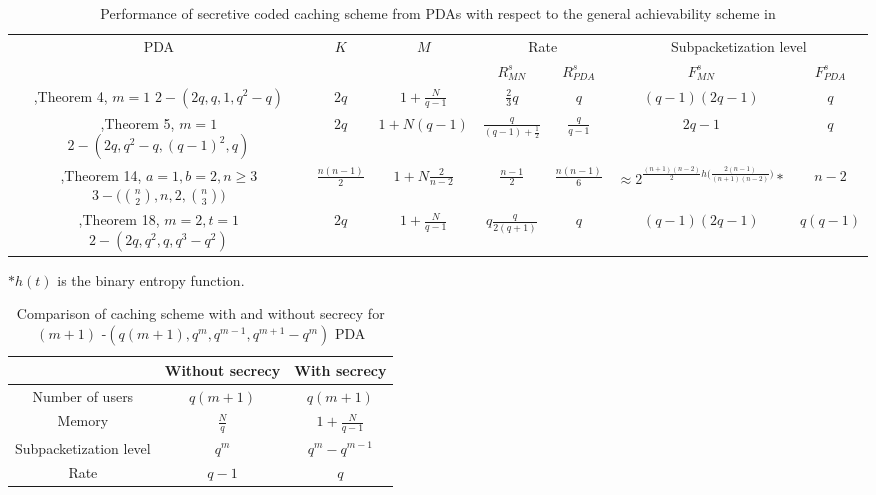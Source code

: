 \documentclass[conference]{IEEEtran}
\begin{document}
\begin{table*}[tp]
	\caption{Performance of secretive coded caching scheme from PDAs with respect to the general achievability scheme in \cite{PrivateCc}}
	\begin{center}
	\begin{tabular}{|c|c|c|c|c|c|c|}
		\hline
		\multirow{2}{*}{PDA} & \multirow{2}{*}{$K$} & \multirow{2}{*}{$M$} & \multicolumn{2}{c|}{Rate} & \multicolumn{2}{c|}{Subpacketization level}\\
		\cline{4-7}
		& & & $R^s_{MN}$\cite{PrivateCc} & $R^s_{PDA}$ & $F^s_{MN}$\cite{PrivateCc} & $F^s_{PDA}$\\
		\hline
		\hline
		\thead{\cite{PDAmain},Theorem 4,\\$m=1$\\$2-(2q,q,1,q^2-q)$} & $2q$ & $1+\frac{N}{q-1}$ & $\frac{2}{3}q$ & $q$ &  $(q-1)(2q-1)$ & $q$ \\
		\hline
		\thead{\cite{PDAmain},Theorem 5,\\$m=1$\\$2-(2q,q^2-q,(q-1)^2,q)$} & $2q$ & $1+N(q-1)$ & $\frac{q}{(q-1)+\frac{1}{2}}$  & $\frac{q}{q-1}$  & $2q-1$ & $q$ \\
		\hline
		\thead{\cite{PDAhyperg},Theorem 14,\\ $a=1,b=2,n\geq 3$\\$3-\bigg(\binom{n}{2},n,2,\binom{n}{3}\bigg)$} & $\frac{n(n-1)}{2}$ & $1+N\frac{2}{n-2}$  &$\frac{n-1}{2}$ & $\frac{n(n-1)}{6}$ & $\approx 2^{\frac{(n+1)(n-2)}{2} h\big(\frac{2(n-1)}{(n+1)(n-2)}\big)}*$  & $n-2$\\
		\hline
		\thead{\cite{PDAhyperg},Theorem 18,\\$m=2,t=1$\\$2-(2q,q^2,q,q^3-q^2)$} & $2q$ & $1+\frac{N}{q-1}$  & $q\frac{q}{2(q+1)}$ & $q$ &  $(q-1)(2q-1)$ & $q(q-1)$\\
		\hline
	\end{tabular}
	\end{center}
	\label{comp}
	 $*h(t)$ is the binary entropy function.
\end{table*}
\begin{table}[htbp]
    \centering
        \caption{Comparison of caching scheme with and without secrecy for $(m+1)$ -$(q(m+1),q^m,q^{m-1},q^{m+1}-q^m)$ PDA \cite{PDAmain}}
    \begin{tabular}{|c|c|c|}
    \hline
      & Without secrecy\cite{PDAmain}  &  With secrecy\\
      \hline
    Number of users & $q(m+1)$ & $q(m+1)$\\
    \hline
    Memory & $\frac{N}{q}$ & $1+\frac{N}{q-1}$\\
    \hline
    Subpacketization level & $q^m$ & $q^m-q^{m-1}$\\
    \hline
    Rate & $q-1$ & $q$\\
    \hline
    \end{tabular}
\label{tab2}
\end{table}
\end{document}
